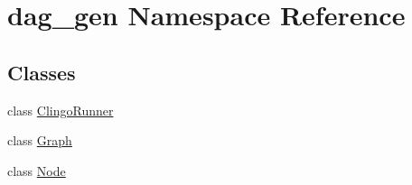 \hypertarget{namespacedag__gen}{}\section{dag\+\_\+gen Namespace Reference}
\label{namespacedag__gen}
\subsection*{Classes}
\begin{DoxyCompactItemize}
\item 
class \hyperlink{classdag__gen_1_1_clingo_runner}{Clingo\+Runner}
\item 
class \hyperlink{classdag__gen_1_1_graph}{Graph}
\item 
class \hyperlink{classdag__gen_1_1_node}{Node}
\end{DoxyCompactItemize}
